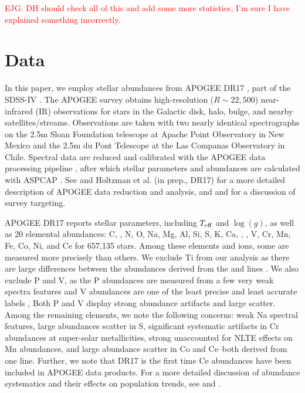 \documentclass[modern]{aastex631}
\newcommand{\logg}{\log(g)}
\newcommand{\teff}{T_{\rm eff}}
\newcommand{\ejg}[1]{\textcolor{red}{EJG: #1}}
\begin{document}
\ejg{DH should check all of this and add some more statistics, I'm sure I have explained something incorrectly.}

\section{Data}\label{sec:data}

In this paper, we employ stellar abundances from APOGEE DR17 \citep{abdurrouf2022}, part of the SDSS-IV \citep{majewski2017}. The APOGEE survey obtains high-resolution ($R\sim22,500$) near-infrared (IR) observations \citep{wilson2019} for stars in the Galactic disk, halo, bulge, and nearby satellites/streams. Observations are taken with two nearly identical spectrographs on the 2.5m Sloan Foundation telescope \citep{wilson2019} at Apache Point Observatory in New Mexico and the 2.5m du Pont Telescope \citep{bowen1973} at the Las Companas Observatory in Chile. Spectral data are reduced and calibrated with the APOGEE data processing pipeline \citep{nidever2015}, after which stellar parameters and abundances are calculated with ASPCAP \citep[APOGEE Stellar Parameter and Chemical Abundance Pipeline][]{holtzman2015, garcia2016}. See \citet[][DR16]{jonsson2020} and Holtzman et al. (in prep., DR17) for a more detailed description of APOGEE data reduction and analysis, and \citet{zasowski2013, zasowski2017} and \citet{santana2021} for a discussion of survey targeting.

APOGEE DR17 reports stellar parameters, including $\teff$ and $\logg$, as well as 20 elemental abundances: C, , N, O, Na, Mg, Al, Si, S, K, Ca, , , V, Cr, Mn, Fe, Co, Ni, and Ce for 657,135 stars. Among these elements and ions, some are measured more precisely than others. We exclude Ti from our analysis as there are large differences between the abundances derived from the  and  lines \citep{jonsson2020}. We also exclude P and V, as the P abundances are measured from a few very weak spectra features and V abundances are one of the least precise and least accurate labels \citep{jonsson2020}, Both P and V display strong abundance artifacts and large scatter. Among the remaining elements, we note the following concerns: weak Na spectral features, large abundances scatter in S, significant systematic artifacts in Cr abundances at super-solar metallicities, strong unaccounted for NLTE effects on Mn abundances, and large abundance scatter in Co and Ce--both derived from one line. Further, we note that DR17 is the first time Ce abundances have been included in APOGEE data products. For a more detailed discussion of abundance systematics and their effects on population trends, see \citet{jonsson2020} and \citet{griffith2021a}.
\end{document}
